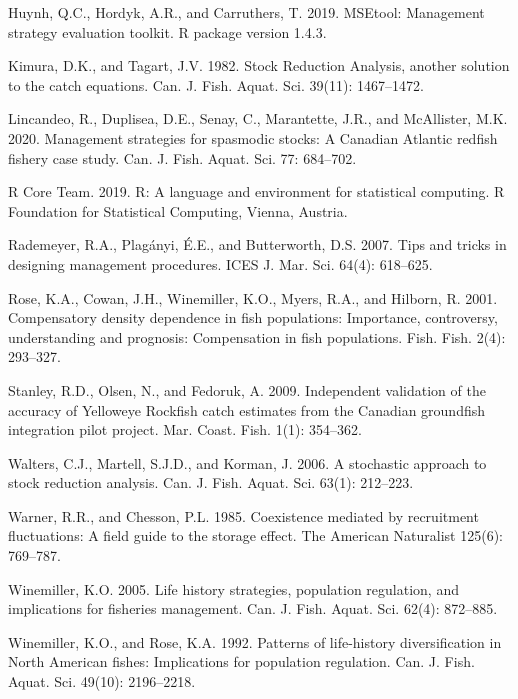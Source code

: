 \documentclass[11pt]{book}
\begin{document}
\begin{CSLReferences}{1}{0}
%
Huynh, Q.C., Hordyk, A.R., and Carruthers, T. 2019. {MSEtool}: Management strategy evaluation toolkit. R package version 1.4.3.

%
Kimura, D.K., and Tagart, J.V. 1982. Stock {Reduction Analysis}, another solution to the catch equations. Can. J. Fish. Aquat. Sci. 39(11): 1467--1472.

%
Lincandeo, R., Duplisea, D.E., Senay, C., Marantette, J.R., and McAllister, M.K. 2020. Management strategies for spasmodic stocks: A {Canadian Atlantic} redfish fishery case study. Can. J. Fish. Aquat. Sci. 77: 684--702.

%
R Core Team. 2019. R: A language and environment for statistical computing. {R Foundation for Statistical Computing}, Vienna, Austria.

%
Rademeyer, R.A., Plagányi, É.E., and Butterworth, D.S. 2007. Tips and tricks in designing management procedures. ICES J. Mar. Sci. 64(4): 618--625.

%
Rose, K.A., Cowan, J.H., Winemiller, K.O., Myers, R.A., and Hilborn, R. 2001. Compensatory density dependence in fish populations: {Importance}, controversy, understanding and prognosis: {Compensation} in fish populations. Fish. Fish. 2(4): 293--327.

%
Stanley, R.D., Olsen, N., and Fedoruk, A. 2009. Independent validation of the accuracy of {Yelloweye Rockfish} catch estimates from the {Canadian} groundfish integration pilot project. Mar. Coast. Fish. 1(1): 354--362.

%
Walters, C.J., Martell, S.J.D., and Korman, J. 2006. A stochastic approach to stock reduction analysis. Can. J. Fish. Aquat. Sci. 63(1): 212--223.

%
Warner, R.R., and Chesson, P.L. 1985. Coexistence mediated by recruitment fluctuations: A field guide to the storage effect. The American Naturalist 125(6): 769--787.

%
Winemiller, K.O. 2005. Life history strategies, population regulation, and implications for fisheries management. Can. J. Fish. Aquat. Sci. 62(4): 872--885.

%
Winemiller, K.O., and Rose, K.A. 1992. Patterns of life-history diversification in {North} {American} fishes: Implications for population regulation. Can. J. Fish. Aquat. Sci. 49(10): 2196--2218.


\end{CSLReferences}
\end{document}
